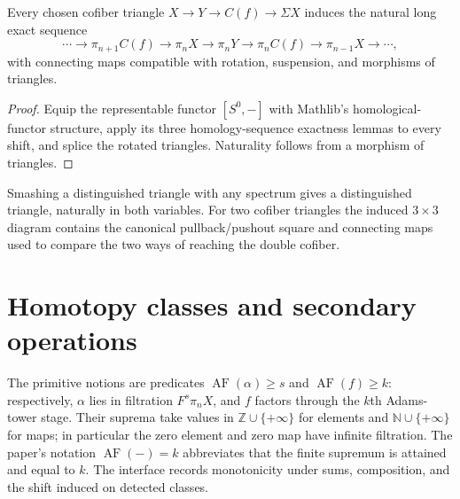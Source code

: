 \begin{theorem}
  \label{thm:stable-homotopy-long-exact}
  \notready
  Every chosen cofiber triangle
  $X\to Y\to C(f)\to\Sigma X$ induces the natural long exact sequence
  \[
    \cdots\to\pi_{n+1}C(f)\to\pi_nX\to\pi_nY
      \to\pi_nC(f)\to\pi_{n-1}X\to\cdots,
  \]
  with connecting maps compatible with rotation, suspension, and morphisms of
  triangles.
\end{theorem}

\begin{proof}
  Equip the representable functor $[S^0,-]$ with Mathlib's homological-functor
  structure, apply its three homology-sequence exactness lemmas to every
  shift, and splice the rotated triangles.  Naturality follows from a morphism
  of triangles.
\end{proof}

\begin{definition}
  \label{def:smash-triangle}
  \notready
  Smashing a distinguished triangle with any spectrum gives a distinguished
  triangle, naturally in both variables.  For two cofiber triangles the
  induced $3\times3$ diagram contains the canonical pullback/pushout square
  and connecting maps used to compare the two ways of reaching the double
  cofiber.
\end{definition}

\section{Homotopy classes and secondary operations}

\begin{definition}
  \label{def:adams-filtration}
  \notready
  The primitive notions are predicates $\operatorname{AF}(\alpha)\ge s$ and
  $\operatorname{AF}(f)\ge k$: respectively, $\alpha$ lies in filtration
  $F^s\pi_nX$, and $f$ factors through the $k$th Adams-tower stage.  Their
  suprema take values in $\mathbb Z\cup\{+\infty\}$ for elements and
  $\mathbb N\cup\{+\infty\}$ for maps; in particular the zero element and zero
  map have infinite filtration.  The paper's notation
  $\operatorname{AF}(-)=k$ abbreviates that the finite supremum is attained
  and equal to $k$.  The interface records monotonicity under sums,
  composition, and the shift induced on detected classes.
\end{definition}

